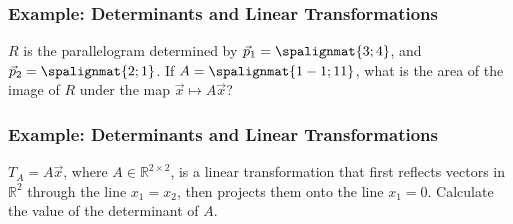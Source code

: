 \begin{frame}\frametitle{Example: Determinants and Linear Transformations}

    $R$ is the parallelogram determined by $\vec p_1 = \spalignmat{3;4}$, and $\vec p_2 = \spalignmat{2;1}$.  If $A = \spalignmat{1 -1;1 1}$, what is the area of the image of $R$ under the map $ \vec x\mapsto A\vec x$? 
    
\end{frame}


\begin{frame}\frametitle{Example: Determinants and Linear Transformations}

    $T_A = A\vec x$, where $A \in \mathbb R^{2\times 2}$, is a linear transformation that first reflects vectors in $\mathbb R^2$ through the line $x_1=x_2$, then projects them onto the line $x_1 = 0$. Calculate the value of the determinant of $A$. 
    


\end{frame}


\frame{

}
